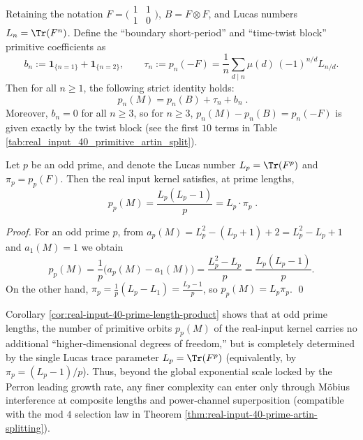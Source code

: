 \begin{corollary}\label{cor:real-input-40-space-twist-boundary-split}
Retaining the notation \(F=\bigl(\begin{smallmatrix}1&1\\[2pt]1&0\end{smallmatrix}\bigr)\), \(B=F\otimes F\), and Lucas numbers \(L_n=\Tr(F^n)\).
Define the ``boundary short-period'' and ``time-twist block'' primitive coefficients as
\[
b_n:=\mathbf{1}_{\{n=1\}}+\mathbf{1}_{\{n=2\}},
\qquad
\tau_n:=p_n(-F)=\frac{1}{n}\sum_{d\mid n}\mu(d)\,(-1)^{n/d}L_{n/d}.
\]
Then for all \(n\ge 1\), the following strict identity holds:
\[
\boxed{\; p_n(M)=p_n(B)+\tau_n+b_n\; }.
\]
Moreover, \(b_n=0\) for all \(n\ge 3\), so for \(n\ge 3\),
\(
p_n(M)-p_n(B)=p_n(-F)
\)
is given exactly by the twist block (see the first \(10\) terms in Table \ref{tab:real_input_40_primitive_artin_split}).
\end{corollary}
\begin{corollary}\label{cor:real-input-40-prime-length-product}
Let \(p\) be an odd prime, and denote the Lucas number \(L_p=\Tr(F^p)\) and \(\pi_p=p_p(F)\). Then the real input kernel satisfies, at prime lengths,
\[
\boxed{\;
p_p(M)=\frac{L_p(L_p-1)}{p}=L_p\cdot \pi_p\; }.
\]
\end{corollary}
\begin{proof}
For an odd prime \(p\), from \(a_p(M)=L_p^2- (L_p+1)+2=L_p^2-L_p+1\) and \(a_1(M)=1\) we obtain
\[
p_p(M)=\frac{1}{p}\bigl(a_p(M)-a_1(M)\bigr)=\frac{L_p^2-L_p}{p}=\frac{L_p(L_p-1)}{p}.
\]
On the other hand, \(\pi_p=\frac{1}{p}(L_p-L_1)=\frac{L_p-1}{p}\), so \(p_p(M)=L_p\pi_p\). \qed
\end{proof}

\begin{remark}\label{rem:real-input-40-prime-local-1d}
Corollary \ref{cor:real-input-40-prime-length-product} shows that at odd prime lengths, the number of primitive orbits
\(
p_p(M)
\)
of the real-input kernel carries no additional ``higher-dimensional degrees of freedom,'' but is completely determined by the single Lucas trace parameter \(L_p=\Tr(F^p)\) (equivalently, by \(\pi_p=(L_p-1)/p\)).
Thus, beyond the global exponential scale locked by the Perron leading growth rate, any finer complexity can enter only through Möbius interference at composite lengths and power-channel superposition (compatible with the mod \(4\) selection law in Theorem \ref{thm:real-input-40-prime-artin-splitting}).
\end{remark}

